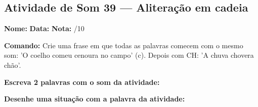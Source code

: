 \subsection{Atividade de Som 39 --- Aliteração em cadeia}
\begin{exercicio}



\noindent\textbf{Nome:} \underline{\hspace{3.2cm}} \quad \textbf{Data:} \underline{\hspace{1.6cm}} \quad \textbf{Nota:} \underline{\hspace{0.9cm}}/10


\noindent\textbf{Comando:} Crie uma frase em que todas as palavras comecem com o mesmo som: 'O coelho comeu cenoura no campo' (c). Depois com CH: 'A chuva chovera chão'.


\begin{center}
\end{center}

\noindent\textbf{Escreva 2 palavras com o som da atividade:}

\begin{center}
  \underline{\hspace{3cm}} \quad \underline{\hspace{3cm}}
\end{center}

\noindent\textbf{Desenhe uma situação com a palavra da atividade:}

\begin{center}
\end{center}

\end{exercicio}



